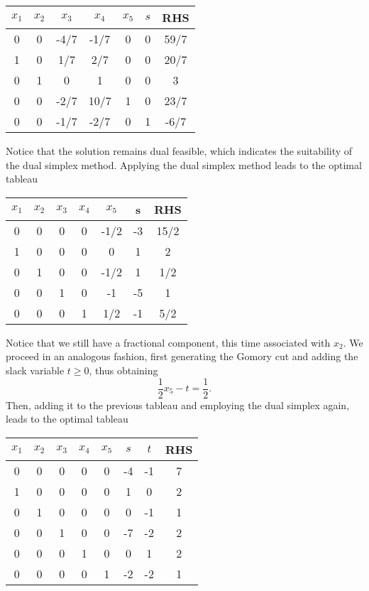 \begin{center}
	\begin{tabular}{cccccc|c}
		$x_1$ & $x_2$ & $x_3$ & $x_4$ & $x_5$ & $s$ & RHS \\ \hline
		0 & 0 & -4/7 & -1/7 &  0 & 0 & 59/7 \\ \hline
		1 & 0 & 1/7 & 2/7   &  0 & 0 & 20/7 \\
		0 & 1 &  0  &  1    &  0 & 0 & 3    \\
		0 & 0 &-2/7 & 10/7  &  1 & 0 & 23/7 \\
		0 & 0 &-1/7 & -2/7  &  0 & 1 & -6/7 
	\end{tabular}	
\end{center}


Notice that the solution remains dual feasible, which indicates the suitability of the dual simplex method. Applying the dual simplex method leads to the optimal tableau 

\begin{center}
	\begin{tabular}{cccccc|c}
		 $x_1$ & $x_2$ & $x_3$ & $x_4$ & $x_5$ & s & RHS\\ \hline
		 0 & 0 & 0 &  0  & -1/2 & -3 & 15/2 \\ \hline
		 1 & 0 & 0 &  0  &  0   &  1  & 2    \\
		 0 & 1 & 0 &  0  & -1/2 &  1 & 1/2  \\
		 0 & 0 & 1 &  0  & -1   & -5 & 1    \\ 
		 0 & 0 & 0 &  1  &  1/2 & -1 & 5/2
	\end{tabular}	
\end{center}

Notice that we still have a fractional component, this time associated with $x_2$. We proceed in an analogous fashion, first generating the Gomory cut and adding the slack variable $t \ge 0$, thus obtaining 
%
\begin{equation*}
	\frac{1}{2}x_5 - t = \frac{1}{2}.
\end{equation*}
%
Then, adding it to the previous tableau and employing the dual simplex again, leads to the optimal tableau

\begin{center}
	\begin{tabular}{ccccccc|c}
	$x_1$ & $x_2$ & $x_3$ & $x_4$ & $x_5$ & $s$ & $t$ & RHS \\ \hline
	0  &  0  &  0  &  0  &  0  & -4  & -1  &  7  \\ \hline 
	1  &  0  &  0  &  0  &  0  &  1  & 0   &  2  \\ 
	0  &  1  &  0  &  0  &  0  &  0  & -1  &  1  \\
	0  &  0  &  1  &  0  &  0  & -7  & -2  &  2  \\ 
	0  &  0  &  0  &  1  &  0  &  0  &  1  &  2  \\
	0  &  0  &  0  &  0  &  1  & -2  & -2  &  1 
	\end{tabular}
\end{center}

